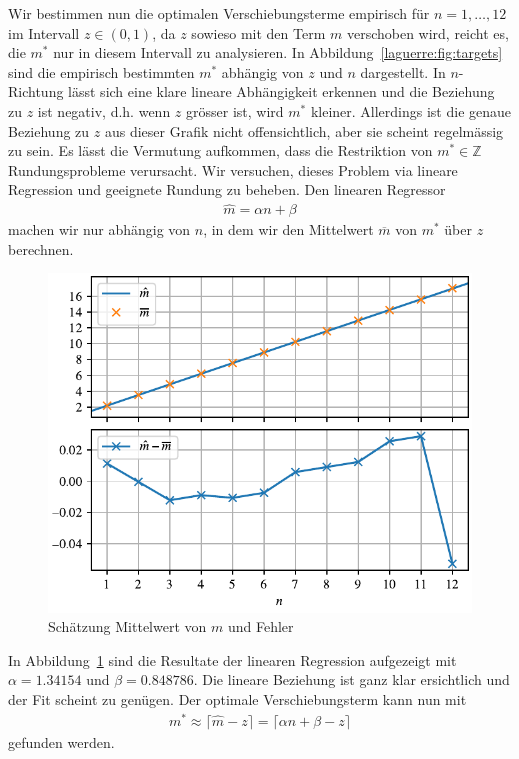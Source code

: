 Wir bestimmen nun die optimalen Verschiebungsterme empirisch
für $n = 1,\ldots, 12$ im Intervall $z \in (0, 1)$,
da $z$ sowieso mit den Term $m$ verschoben wird,
reicht es,
die $m^*$ nur in diesem Intervall zu analysieren.
In Abbildung~\ref{laguerre:fig:targets} sind die empirisch bestimmten $m^*$
abhängig von $z$ und $n$ dargestellt.
In $n$-Richtung lässt sich eine klare lineare Abhängigkeit erkennen und
die Beziehung zu $z$ ist negativ,
d.h. wenn $z$ grösser ist, wird $m^*$ kleiner.
Allerdings ist die genaue Beziehung zu $z$
aus dieser Grafik nicht offensichtlich,
aber sie scheint regelmässig zu sein.
Es lässt die Vermutung aufkommen,
dass die Restriktion von $m^* \in \mathbb{Z}$ Rundungsprobleme verursacht.
Wir versuchen,
dieses Problem via lineare Regression und geeignete Rundung zu beheben.
Den linearen Regressor
\begin{align*}
\hat{m}
=
\alpha n + \beta
\end{align*}
machen wir nur abhängig von $n$,
in dem wir den Mittelwert $\overline{m}$ von $m^*$ über $z$ berechnen.

\begin{figure}
\centering
% 
\includegraphics{papers/laguerre/images/estimates.pdf}
\caption{Schätzung Mittelwert von $m$ und Fehler}
\label{laguerre:fig:schaetzung}
\end{figure}

In Abbildung~\ref{laguerre:fig:schaetzung} sind die Resultate
der linearen Regression aufgezeigt mit $\alpha = 1.34154$ und $\beta =
0.848786$.
Die lineare Beziehung ist ganz klar ersichtlich und der Fit scheint zu genügen.
Der optimale Verschiebungsterm kann nun mit
\begin{align*}
m^*
\approx
\lceil \hat{m} - z \rceil
=
\lceil \alpha n + \beta - z \rceil
\end{align*}
gefunden werden.

